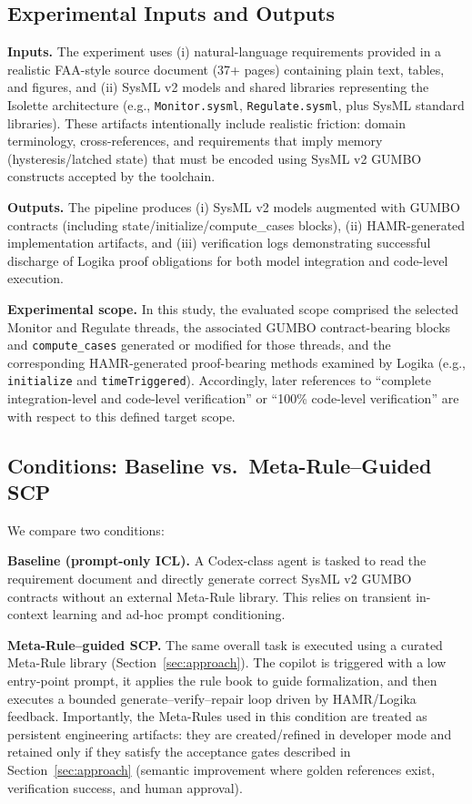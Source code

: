 \documentclass[conference]{IEEEtran}
\begin{document}
\subsection{Experimental Inputs and Outputs}
\textbf{Inputs.} The experiment uses (i) natural-language requirements provided in a realistic FAA-style source document (37+ pages) containing plain text, tables, and figures, and (ii) SysML v2 models and shared libraries representing the Isolette architecture (e.g., \texttt{Monitor.sysml}, \texttt{Regulate.sysml}, plus SysML standard libraries).%
These artifacts intentionally include realistic friction: domain terminology, cross-references, and requirements that imply memory (hysteresis/latched state) that must be encoded using SysML v2 GUMBO constructs accepted by the toolchain.

\textbf{Outputs.} The pipeline produces (i) SysML v2 models augmented with GUMBO contracts (including state/initialize/compute\_cases blocks), (ii) HAMR-generated implementation artifacts, and (iii) verification logs demonstrating successful discharge of Logika proof obligations for both model integration and code-level execution.

\textbf{Experimental scope.} In this study, the evaluated scope comprised the selected Monitor and Regulate threads, the associated GUMBO contract-bearing blocks and \texttt{compute\_cases} generated or modified for those threads, and the corresponding HAMR-generated proof-bearing methods examined by Logika (e.g., \texttt{initialize} and \texttt{timeTriggered}). Accordingly, later references to ``complete integration-level and code-level verification'' or ``100\% code-level verification'' are with respect to this defined target scope.

\subsection{Conditions: Baseline vs.\ Meta-Rule--Guided SCP}
We compare two conditions:

\textbf{Baseline (prompt-only ICL).} A Codex-class agent is tasked to read the requirement document and directly generate correct SysML v2 GUMBO contracts without an external Meta-Rule library. This relies on transient in-context learning and ad-hoc prompt conditioning.

\textbf{Meta-Rule--guided SCP.} The same overall task is executed using a curated Meta-Rule library (Section~\ref{sec:approach}). The copilot is triggered with a low entry-point prompt, it applies the rule book to guide formalization, and then executes a bounded generate--verify--repair loop driven by HAMR/Logika feedback. Importantly, the Meta-Rules used in this condition are treated as persistent engineering artifacts: they are created/refined in developer mode and retained only if they satisfy the acceptance gates described in Section~\ref{sec:approach} (semantic improvement where golden references exist, verification success, and human approval).
\end{document}
